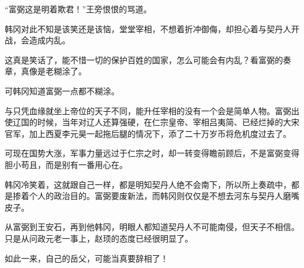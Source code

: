 “富弼这是明着欺君！”王旁恨恨的骂道。

韩冈对此不知是该笑还是该恼，堂堂宰相，不想着折冲御侮，却担心着与契丹人开战，会造成内乱。

这真是笑话了，能不惜一切的保护百姓的国家，怎么可能会有内乱？看富弼的奏章，真像是老糊涂了。

可韩冈知道富弼一点都不糊涂。

与只凭血缘就坐上帝位的天子不同，能升任宰相的没有一个会是简单人物。富弼出使辽国的时候，当年对辽人还算强硬，在仁宗皇帝、宰相吕夷简、已经烂掉的大宋官军，加上西夏李元昊一起拖后腿的情况下，添了二十万岁币将危机度过去了。

可现在国势大涨，军事力量远过于仁宗之时，却一转变得瞻前顾后，不是富弼变得胆小苟且，而是别有一番用心在。

韩冈冷笑着，这就跟自己一样，都是明知契丹人绝不会南下，所以所上奏疏中，都是掺着个人的政治目的。富弼要废新法，而韩冈则仅仅是不想去河东与契丹人磨嘴皮子。

从富弼到王安石，再到他韩冈，明眼人都知道契丹人不可能南侵，但天子不相信。只是从问政元老一事上，赵顼的态度已经很明显了。

如此一来，自己的岳父，可能当真要辞相了！

